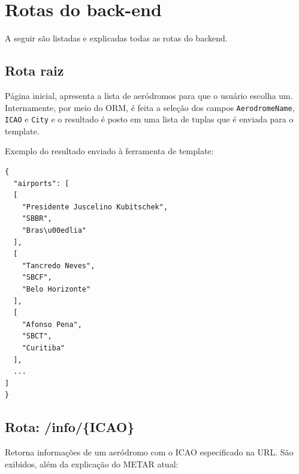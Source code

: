 \chapter{Rotas do back-end}

A seguir são listadas e explicadas todas as rotas do backend.

\section{Rota raiz}

Página inicial, apresenta a lista de aeródromos para que o usuário escolha um. 
Internamente, por meio do ORM, é feita a seleção dos campos \texttt{AerodromeName},
\texttt{ICAO} e \texttt{City} e o resultado é posto em uma lista de tuplas que é 
enviada para o template.

Exemplo do resultado enviado à ferramenta de template:
\begin{smaller}
\begin{verbatim}
{
  "airports": [
  [
    "Presidente Juscelino Kubitschek",
    "SBBR",
    "Bras\u00edlia"
  ],
  [
    "Tancredo Neves",
    "SBCF",
    "Belo Horizonte"
  ],
  [
    "Afonso Pena",
    "SBCT",
    "Curitiba"
  ],
  ...
]
}
\end{verbatim}
\end{smaller}


\section{Rota: /info/\{ICAO\}}

Retorna informações de um aeródromo com o ICAO especificado na URL. São exibidos,
além da explicação do METAR atual:

